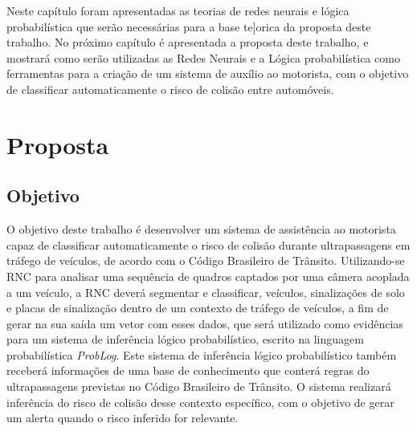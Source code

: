 \documentclass[
	12pt,				%
    oneside,			%
	a4paper,			%
	english,			%
	french,				%
	spanish,			%
	brazil,				%
	]{abntex2}
\begin{document}
Neste capítulo foram apresentadas as teorias de redes neurais e lógica probabilística que serão necessárias para a base te]orica da proposta deste trabalho. No próximo capítulo é apresentada a proposta deste trabalho, e mostrará como serão utilizadas as Redes Neurais e a Lógica probabilística como ferramentas para a criação de um sistema de auxílio ao motorista, com o objetivo de classificar automaticamente o risco de colisão entre automóveis.










\chapter {Proposta}

\section {Objetivo}
O objetivo deste trabalho é desenvolver um sistema de assistência ao motorista capaz de classificar automaticamente o risco de colisão durante ultrapassagens em tráfego de veículos, de acordo com o Código Brasileiro de Trânsito. Utilizando-se RNC para analisar uma sequência de quadros captados por uma câmera acoplada a um veículo, a RNC deverá segmentar e classificar, veículos, sinalizações de solo e placas de sinalização dentro de um contexto de tráfego de veículos, a fim de gerar na sua saída um vetor com esses dados, que será utilizado como evidências para um sistema de inferência lógico probabilístico, escrito na linguagem probabilística \textit{ProbLog}. Este sistema de inferência lógico probabilístico também receberá informações de uma base de conhecimento que conterá regras do ultrapassagens previstas no Código Brasileiro de Trânsito. O sistema realizará inferência do risco de colisão desse contexto específico, com o objetivo de gerar um alerta quando o risco inferido for relevante.
\end{document}
